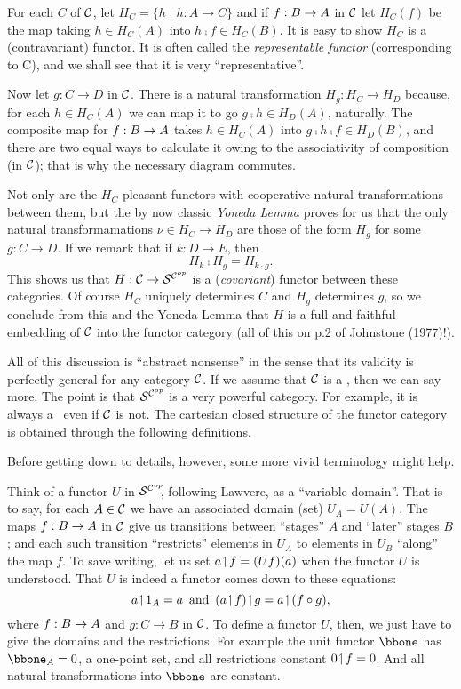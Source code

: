 For each $C$ of $\mathcal C$, let $H_C = \{ h \mid h: A \to C \}$ and if $f: B \rightarrow A$ in $\mathcal C$ let
$H_C(f)$ be the map taking $h \in H_C(A)$ into $h \comp f \in H_C(B)$. It is easy to show
$H_C$ is a (contravariant) functor. It is often called the {\it representable functor}
(corresponding to C), and we shall see that it is very ``representative''.

Now let $g: C \to D$ in $\mathcal C$. There is a natural transformation $H_g: H_C \to H_D$
because, for each $h \in H_C(A)$ we can map it to go $g \comp h \in H_D(A)$, naturally.
The composite map for $f : B \rightarrow A$ takes $h \in H_C(A)$ into $g \comp h \comp f \in H_D(B)$,
and there are two equal ways to calculate it owing to the associativity of composition (in
$\mathcal C$); that is why the necessary diagram commutes.

Not only are the $H_C$ pleasant functors with cooperative natural transformations between
them, but the by now classic {\it Yoneda Lemma} proves for us that the only natural
transformamations $\nu \in H_C \to H_D$ are those of the form $H_g$ for some $g: C\to D$.
If we remark that if $k:D\to E$, then
\[
H_k \comp H_g = H_{k \comp g}.
\]
%
This shows us that $H : \mathcal C \rightarrow \mathcal S^{\mathcal C^{op}}$ is a ({\it covariant}) functor between these
categories. Of course $H_C$ uniquely determines $C$ and $H_g$ determines $g$, so we
conclude from this and the Yoneda Lemma that $H$ is a full and faithful embedding of $\mathcal C$
into the functor category (all of this on p.2 of Johnstone (1977)!).

All of this discussion is ``abstract nonsense'' in the sense that its validity is
perfectly general for any category $\mathcal C$. If we assume that $\mathcal C$ is a \ccc, then we can say
more. The point is that $\mathcal S^{\mathcal C^{op}}$ is a very powerful category. For example, it is always a
\ccc\  even if $\mathcal C$ is not. The cartesian closed structure of the functor category is
obtained through the following definitions.

Before getting down to details, however, some more vivid terminology might help.

Think of a functor $U$ in $\mathcal S^{\mathcal C^{op}}\!\!$, following Lawvere, as a ``variable domain''.  That
is to say, for each $A \in \mathcal C$ we have an associated domain (set) $U_A = U(A)$. The maps
$f:B \rightarrow A$ in $\mathcal C$ give us transitions between ``stages'' $A$ and ``later'' stages $B$; and
each such transition ``restricts'' elements in $U_A$ to elements in $U_B$ ``along'' the
map $f$. To save writing, let us set $a \!\upharpoonleft\! f = (Uf)(a)$ when the functor $U$ is
understood. That $U$ is indeed a functor comes down to these equations:
$$
a \res \id_A = a \,\textrm{ and }\, (a \res f) \res g = a \res (f \comp g),
$$
where  $f : B \rightarrow A$ and $g: C\to B$ in $\mathcal C$. To define a functor $U$, then, we just have to
give the domains and the restrictions. For example the unit functor $\bbone$ has $\bbone_A
= {0}$, a one-point set, and all restrictions constant $0 \!\upharpoonleft\! f = 0$. And all natural
transformations into $\bbone$ are constant.

